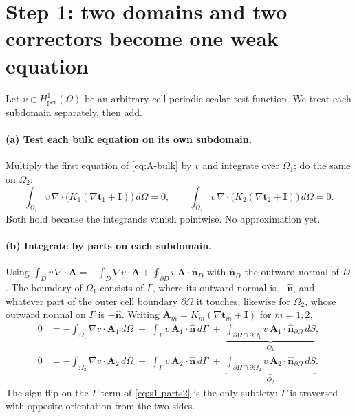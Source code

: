 \documentclass[11pt]{article}
\newcommand{\Om}{\Omega}
\newcommand{\Gam}{\Gamma}
\newcommand{\bn}{\hat{\mathbf n}}
\newcommand{\bt}{\mathbf t}
\newcommand{\bI}{\mathbf I}
\newcommand{\Hper}{H^1_{\mathrm{per}}(\Om)}
\begin{document}
\section{Step 1: two domains and two correctors become one weak equation}
\label{sec:step1}

Let $v\in\Hper$ be an arbitrary cell-periodic scalar test function. We treat
each subdomain separately, then add.

\paragraph{(a) Test each bulk equation on its own subdomain.}
Multiply the first equation of \eqref{eq:A-bulk} by $v$ and integrate over
$\Om_1$; do the same on $\Om_2$:
\begin{equation}
\int_{\Om_1}\! v\,\nabla\!\cdot\!\big(K_1(\nabla\bt_1+\bI)\big)\,d\Om=0,
\qquad
\int_{\Om_2}\! v\,\nabla\!\cdot\!\big(K_2(\nabla\bt_2+\bI)\big)\,d\Om=0 .
\label{eq:s1-multiply}
\end{equation}
Both hold because the integrands vanish pointwise. No approximation yet.

\paragraph{(b) Integrate by parts on each subdomain.}
Using $\int_D v\,\nabla\!\cdot\!\mathbf A=-\int_D\nabla v\cdot\mathbf A
+\oint_{\partial D}v\,\mathbf A\!\cdot\!\bn_D$ with $\bn_D$ the outward normal
of $D$. The boundary of $\Om_1$ consists of $\Gam$, where its outward normal is
$+\bn$, and whatever part of the outer cell boundary $\partial\Om$ it touches;
likewise for $\Om_2$, whose outward normal on $\Gam$ is $-\bn$. Writing
$\mathbf A_m=K_m(\nabla\bt_m+\bI)$ for $m=1,2$,
\begin{align}
0&=-\int_{\Om_1}\!\nabla v\cdot\mathbf A_1\,d\Om
   \;+\;\int_{\Gam} v\,\mathbf A_1\!\cdot\!\bn\,d\Gam
   \;+\;\underbrace{\int_{\partial\Om\cap\partial\Om_1}\!\! v\,\mathbf A_1\!\cdot\!\bn_{\partial\Om}\,dS}_{\textstyle O_1},
\label{eq:s1-parts1}\\
0&=-\int_{\Om_2}\!\nabla v\cdot\mathbf A_2\,d\Om
   \;-\;\int_{\Gam} v\,\mathbf A_2\!\cdot\!\bn\,d\Gam
   \;+\;\underbrace{\int_{\partial\Om\cap\partial\Om_2}\!\! v\,\mathbf A_2\!\cdot\!\bn_{\partial\Om}\,dS}_{\textstyle O_2}.
\label{eq:s1-parts2}
\end{align}
The sign flip on the $\Gam$ term of \eqref{eq:s1-parts2} is the only subtlety:
$\Gam$ is traversed with opposite orientation from the two sides.
\end{document}
